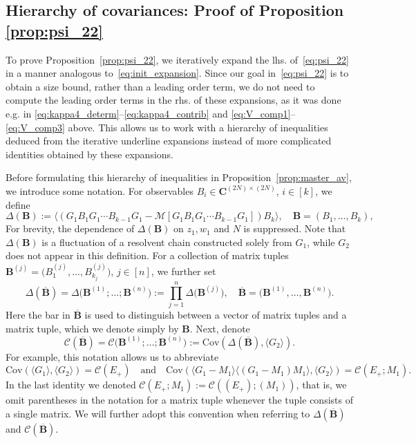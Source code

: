 \documentclass[10pt]{amsart}
\numberwithin{equation}{section}
\newcommand{\C}{\mathbf{C}}
\newcommand{\Cov}{\mathrm{Cov}}
\begin{document}
\subsection{Hierarchy of covariances: Proof of Proposition \ref{prop:psi_22}}\label{sec:H_Cov}

To prove Proposition~\ref{prop:psi_22}, we iteratively expand the lhs. of~\eqref{eq:psi_22} in a manner analogous to~\eqref{eq:init_expansion}. Since our goal in~\eqref{eq:psi_22} is to obtain a size bound, rather than a leading order term, we do not need to compute the leading order terms in the rhs. of these expansions, as it was done e.g. in \eqref{eq:kappa4_determ}--\eqref{eq:kappa4_contrib} and \eqref{eq:V_comp1}--\eqref{eq:V_comp3} above. This allows us to work with a hierarchy of inequalities deduced from the iterative underline expansions instead of more complicated  identities obtained by these expansions. 

Before formulating this hierarchy of inequalities in Proposition~\ref{prop:master_av}, we introduce some notation. For observables $B_i\in \C^{(2N)\times (2N)}$, $i\in[k]$, we define
\begin{equation}
\Delta(\bm{B}):=\langle \left(G_1 B_1 G_1\cdots B_{k-1}G_1 - \mathcal{M}[G_1 B_1 G_1\cdots B_{k-1}G_1]\right) B_k\rangle,\quad \bm{B}=(B_1,\ldots,B_k),
\label{eq:def_delta}
\end{equation}
For brevity, the dependence of $\Delta(\bm{B})$ on $z_1,w_1$ and $N$ is suppressed. Note that $\Delta(\bm{B})$ is a fluctuation of a resolvent chain constructed solely from $G_1$, while $G_2$ does not appear in this definition. For a collection of matrix tuples $\bm{B}^{(j)}=\big(B_1^{(j)},\ldots, B_{k_j}^{(j)}\big)$, $j\in [n]$, we further set
\begin{equation*}
\Delta\left(\overline{\bm{B}}\right)=\Delta\big(\bm{B}^{(1)};\ldots;\bm{B}^{(n)}\big):=\prod_{j=1}^n \Delta\big(\bm{B}^{(j)}\big),\quad \overline{\bm{B}} = \big(\bm{B}^{(1)},\ldots, \bm{B}^{(n)}\big).
\end{equation*}
Here the bar in $\overline{\bm{B}}$ is used to distinguish between a vector of matrix tuples and a matrix tuple, which we denote simply by $\bm{B}$. Next, denote
\begin{equation}
\mathcal{C}\left(\overline{\bm{B}}\right)=\mathcal{C}\big(\bm{B}^{(1)};\ldots;\bm{B}^{(n)}\big):=\Cov \left(\Delta\left(\overline{\bm{B}}\right),\langle G_2\rangle\right).
\end{equation}
For example, this notation allows us to abbreviate
\begin{equation*}
\Cov(\langle G_1\rangle,\langle G_2\rangle)=\mathcal{C}(E_+)\quad\text{and}\quad  \Cov\left(\langle G_1-M_1\rangle\langle (G_1-M_1)M_1\rangle, \langle G_2\rangle\right)=\mathcal{C}\left(E_+; M_1\right).
\end{equation*}
In the last identity we denoted $\mathcal{C}\left(E_+; M_1\right):=\mathcal{C}\left((E_+); (M_1)\right)$, that is, we omit parentheses in the notation for a matrix tuple whenever the tuple consists of a single matrix. We will further adopt this convention when referring to $\Delta(\overline{\bm{B}})$ and $\mathcal{C}(\overline{\bm{B}})$.
\end{document}
